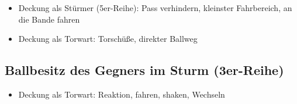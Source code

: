 \begin{itemize}
\item Deckung als Stürmer (5er-Reihe): Pass verhindern, kleinster Fahrbereich, an die Bande fahren
\item Deckung als Torwart: Torschüße, direkter Ballweg
\end{itemize}


\subsection{Ballbesitz des Gegners im Sturm (3er-Reihe)}
\label{technik:defensive:gegnersturm}

\begin{itemize}
\item Deckung als Torwart: Reaktion, fahren, shaken, Wechseln
\end{itemize}

